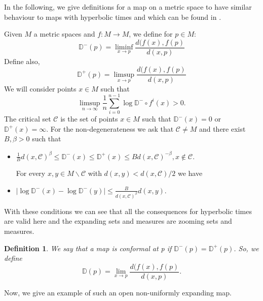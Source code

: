 \documentclass[12pt,a4paper]{amsart}
\theoremstyle{plain}
\newtheorem{definition}{Definition}[subsection]
\begin{document}
\bigskip

In the following, we give definitions for a map on a metric space to have similar behaviour to maps with hyperbolic times and which can be found in \cite{Pi1}.  

Given $M$ a metric spaces and $f: M \to M$, we define for $p \in M$:
\[
\displaystyle \mathbb{D}^{-}(p) = \liminf_{x \to p} \frac{d(f(x),f(p)}{d(x,p)}
\]
Define also,
\[
\displaystyle \mathbb{D}^{+}(p) = \limsup_{x \to p} \frac{d(f(x),f(p)}{d(x,p)}
\]
We will consider points $x \in M$ such that 
\[
\displaystyle \limsup_{n \to \infty} \frac{1}{n} \sum_{i=0}^{n-1} \log \mathbb{D}^{-} \circ f^{i}(x) > 0.
\]  
The critical set $\mathcal{C}$ is the set of points $x \in M$ such that $\mathbb{D}^{-}(x) = 0$ or $\mathbb{D}^{+}(x) = \infty$. For  the non-degenerateness we ask that $\mathcal{C} \neq M$ and there exist $B, \beta >0$ such that

\begin{itemize}
	
	\item $\frac{1}{B} d(x,\mathcal{C})^{\beta} \leq \mathbb{D}^{-}(x) \leq \mathbb{D}^{+}(x) \leq B d(x,\mathcal{C})^{-\beta}, x \not \in \mathcal{C}$.
	
	For every $x, y \in M \backslash \mathcal{C}$ with $d(x,y) < d(x,\mathcal{C})/2$ we have
	
	\item $\mid \log \mathbb{D}^{-}(x) - \log \mathbb{D}^{-}(y) \mid \leq \frac{B}{d(x,\mathcal{C})^{\beta}} d(x,y)$.
	
\end{itemize}

With these conditions we can see that all the consequences for hyperbolic times are valid here and the expanding sets and measures are zooming sets and measures.

\begin{definition}
	We say that a map is \emph{conformal at p} if $\mathbb{D}^{-}(p) = \mathbb{D}^{+}(p)$. So, we define
	\[
	\displaystyle \mathbb{D}(p) = \lim_{x \to p} \frac{d(f(x),f(p)}{d(x,p)}.
	\]
\end{definition}

Now, we give an example of such an open non-uniformly expanding map.  
\end{document}
